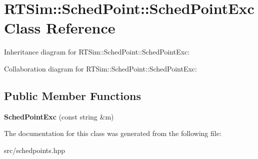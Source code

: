 \hypertarget{classRTSim_1_1SchedPoint_1_1SchedPointExc}{}\section{R\+T\+Sim\+:\+:Sched\+Point\+:\+:Sched\+Point\+Exc Class Reference}
\label{classRTSim_1_1SchedPoint_1_1SchedPointExc}


Inheritance diagram for R\+T\+Sim\+:\+:Sched\+Point\+:\+:Sched\+Point\+Exc\+:


Collaboration diagram for R\+T\+Sim\+:\+:Sched\+Point\+:\+:Sched\+Point\+Exc\+:
\subsection*{Public Member Functions}
\begin{DoxyCompactItemize}
\item 
{\bfseries Sched\+Point\+Exc} (const string \&m)\hypertarget{classRTSim_1_1SchedPoint_1_1SchedPointExc_a13bcc8bc3c08c8ae8f30e06aa5640943}{}\label{classRTSim_1_1SchedPoint_1_1SchedPointExc_a13bcc8bc3c08c8ae8f30e06aa5640943}

\end{DoxyCompactItemize}


The documentation for this class was generated from the following file\+:\begin{DoxyCompactItemize}
\item 
src/schedpoints.\+hpp\end{DoxyCompactItemize}
